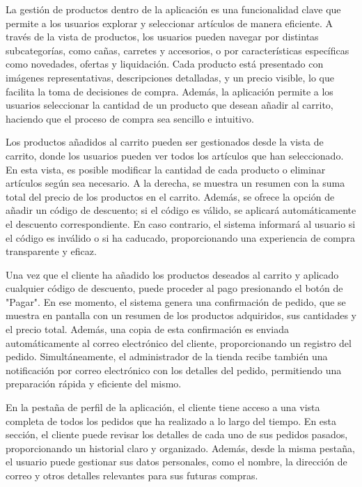 La gestión de productos dentro de la aplicación es una funcionalidad clave que permite a los usuarios explorar y seleccionar artículos de manera eficiente. A través de la vista de productos, los usuarios pueden navegar por distintas subcategorías, como cañas, carretes y accesorios, o por características específicas como novedades, ofertas y liquidación. Cada producto está presentado con imágenes representativas, descripciones detalladas, y un precio visible, lo que facilita la toma de decisiones de compra. Además, la aplicación permite a los usuarios seleccionar la cantidad de un producto que desean añadir al carrito, haciendo que el proceso de compra sea sencillo e intuitivo.

\vspace{0.5cm}

Los productos añadidos al carrito pueden ser gestionados desde la vista de carrito, donde los usuarios pueden ver todos los artículos que han seleccionado. En esta vista, es posible modificar la cantidad de cada producto o eliminar artículos según sea necesario. A la derecha, se muestra un resumen con la suma total del precio de los productos en el carrito. Además, se ofrece la opción de añadir un código de descuento; si el código es válido, se aplicará automáticamente el descuento correspondiente. En caso contrario, el sistema informará al usuario si el código es inválido o si ha caducado, proporcionando una experiencia de compra transparente y eficaz.

\vspace{0.5cm}

Una vez que el cliente ha añadido los productos deseados al carrito y aplicado cualquier código de descuento, puede proceder al pago presionando el botón de "Pagar". En ese momento, el sistema genera una confirmación de pedido, que se muestra en pantalla con un resumen de los productos adquiridos, sus cantidades y el precio total. Además, una copia de esta confirmación es enviada automáticamente al correo electrónico del cliente, proporcionando un registro del pedido. Simultáneamente, el administrador de la tienda recibe también una notificación por correo electrónico con los detalles del pedido, permitiendo una preparación rápida y eficiente del mismo.

\vspace{0.5cm}

En la pestaña de perfil de la aplicación, el cliente tiene acceso a una vista completa de todos los pedidos que ha realizado a lo largo del tiempo. En esta sección, el cliente puede revisar los detalles de cada uno de sus pedidos pasados, proporcionando un historial claro y organizado. Además, desde la misma pestaña, el usuario puede gestionar sus datos personales, como el nombre, la dirección de correo y otros detalles relevantes para sus futuras compras.

